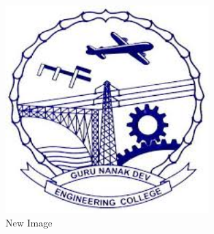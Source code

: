 \documentclass{article}
\begin{document}
\begin{figure}
\centering
\includegraphics[width=0.7\textwidth]{../../images/gnelogo}
\caption{New Image}
\label{fig:gnelogo2}
\end{figure}
\end{document}
